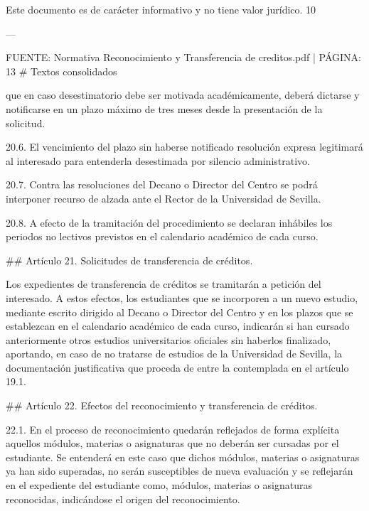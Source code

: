 \documentclass{article}
\begin{document}
\begin{itemize}
\begin{itemize}
\begin{scriptsize}
                  Este documento es de carácter informativo y no tiene valor jurídico.
                  10

                  ---

                  FUENTE: Normativa Reconocimiento y Transferencia de creditos.pdf | PÁGINA: 13
                  \# Textos consolidados

                  que en caso desestimatorio debe ser motivada académicamente, deberá dictarse y notificarse en un plazo máximo de tres meses desde la presentación de la solicitud.

                  20.6. El vencimiento del plazo sin haberse notificado resolución expresa legitimará al interesado para entenderla desestimada por silencio administrativo.

                  20.7. Contra las resoluciones del Decano o Director del Centro se podrá interponer recurso de alzada ante el Rector de la Universidad de Sevilla.

                  20.8. A efecto de la tramitación del procedimiento se declaran inhábiles los periodos no lectivos previstos en el calendario académico de cada curso.

                  \#\# Artículo 21. Solicitudes de transferencia de créditos.

                  Los expedientes de transferencia de créditos se tramitarán a petición del interesado. A estos efectos, los estudiantes que se incorporen a un nuevo estudio, mediante escrito dirigido al Decano o Director del Centro y en los plazos que se establezcan en el calendario académico de cada curso, indicarán si han cursado anteriormente otros estudios universitarios oficiales sin haberlos finalizado, aportando, en caso de no tratarse de estudios de la Universidad de Sevilla, la documentación justificativa que proceda de entre la contemplada en el artículo 19.1.

                  \#\# Artículo 22. Efectos del reconocimiento y transferencia de créditos.

                  22.1. En el proceso de reconocimiento quedarán reflejados de forma explícita aquellos módulos, materias o asignaturas que no deberán ser cursadas por el estudiante. Se entenderá en este caso que dichos módulos, materias o asignaturas ya han sido superadas, no serán susceptibles de nueva evaluación y se reflejarán en el expediente del estudiante como, módulos, materias o asignaturas reconocidas, indicándose el origen del reconocimiento.


\end{scriptsize}
\end{itemize}
\end{itemize}
\end{document}
